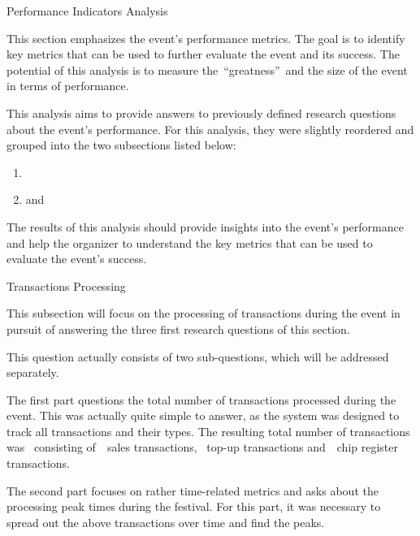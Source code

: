 \begin{section}{Performance Indicators Analysis}
	\label{sec:analysis-performance-indicators}

	This section emphasizes the event's performance metrics.
	The goal is to identify key metrics that can be used to further evaluate the event and its success.
	The potential of this analysis is to measure the~\enquote{greatness}~and the size of the event in terms of performance.

	This analysis aims to provide answers to previously defined research questions about the event's performance.
	For this analysis, they were slightly reordered and grouped into the two subsections listed below:
	\begin{enumerate}
		\item {}
		\item and~
	\end{enumerate}

	The results of this analysis should provide insights into the event's performance and help the organizer to understand the key metrics that can be used to evaluate the event's success.

	\begin{subsection}{Transactions Processing}
		\label{subsec:analysis-performance-indicators-transactions}

		This subsection will focus on the processing of transactions during the event in pursuit of answering the three first research questions of this section.


		This question actually consists of two sub-questions, which will be addressed separately.

		The first part questions the total number of transactions processed during the event.
		This was actually quite simple to answer, as the system was designed to track all transactions and their types.
		The resulting total number of transactions was~ consisting of~~sales transactions, ~top-up transactions and~~chip register transactions.

		The second part focuses on rather time-related metrics and asks about the processing peak times during the festival.
		For this part, it was necessary to spread out the above transactions over time and find the peaks.


\end{subsection}
\end{section}
